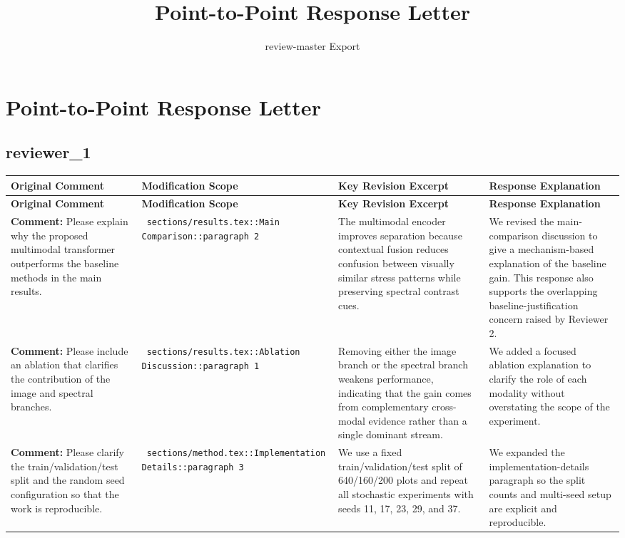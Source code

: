 \documentclass[11pt]{article}
\title{ Point-to-Point Response Letter }
\author{ review-master Export }
\date{}
\begin{document}
\maketitle

\section*{ Point-to-Point Response Letter }

\subsection*{ reviewer\_1 }
\begin{longtable}{|p{}|p{}|p{}|p{}|}
\hline
\textbf{ Original Comment } & \textbf{ Modification Scope } & \textbf{ Key Revision Excerpt } & \textbf{ Response Explanation } \\
\hline
\endfirsthead
\hline
\textbf{ Original Comment } & \textbf{ Modification Scope } & \textbf{ Key Revision Excerpt } & \textbf{ Response Explanation } \\
\hline
\endhead
\textbf{ Comment: } Please explain why the proposed multimodal transformer outperforms the baseline methods in the main results. & \texttt{ sections/results.tex::Main Comparison::paragraph 2 } & {\color{blue}\ttfamily The multimodal encoder improves separation because contextual fusion reduces confusion between visually similar stress patterns while preserving spectral contrast cues.} & We revised the main-comparison discussion to give a mechanism-based explanation of the baseline gain. This response also supports the overlapping baseline-justification concern raised by Reviewer 2. \\
\hline
\textbf{ Comment: } Please include an ablation that clarifies the contribution of the image and spectral branches. & \texttt{ sections/results.tex::Ablation Discussion::paragraph 1 } & {\color{blue}\ttfamily Removing either the image branch or the spectral branch weakens performance, indicating that the gain comes from complementary cross-modal evidence rather than a single dominant stream.} & We added a focused ablation explanation to clarify the role of each modality without overstating the scope of the experiment. \\
\hline
\textbf{ Comment: } Please clarify the train/validation/test split and the random seed configuration so that the work is reproducible. & \texttt{ sections/method.tex::Implementation Details::paragraph 3 } & {\color{blue}\ttfamily We use a fixed train/validation/test split of 640/160/200 plots and repeat all stochastic experiments with seeds 11, 17, 23, 29, and 37.} & We expanded the implementation-details paragraph so the split counts and multi-seed setup are explicit and reproducible. \\
\hline
\end{longtable}
\end{document}
